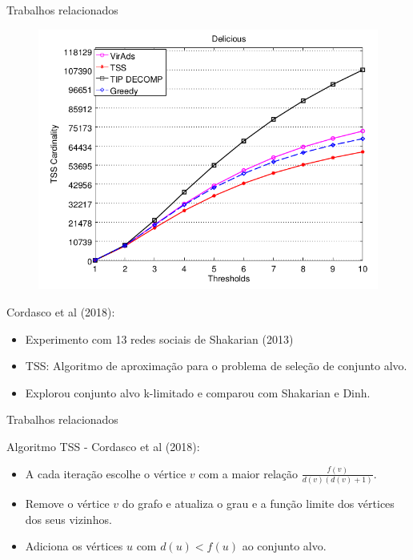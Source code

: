 \documentclass{beamer}
\begin{document}
\begin{frame}{Trabalhos relacionados}
\protect\hypertarget{trabalhos-relacionados-3}{}
\begin{figure}
\centering
\includegraphics[scale=0.2]{img/cordasco.png}
\end{figure}

Cordasco et al (2018):

\begin{itemize}
\tightlist
\item
  Experimento com 13 redes sociais de Shakarian (2013)
\item
  TSS: Algoritmo de aproximação para o problema de seleção de conjunto
  alvo.
\item
  Explorou conjunto alvo k-limitado e comparou com Shakarian e Dinh.
\end{itemize}
\end{frame}

\begin{frame}{Trabalhos relacionados}

Algoritmo TSS - Cordasco et al (2018):

\begin{itemize}
\tightlist
\item
  A cada iteração escolhe o vértice \(v\) com a maior relação
  \(\frac{f(v)}{d(v)(d(v)+1)}\).
\item
  Remove o vértice \(v\) do grafo e atualiza o grau e a função limite
  dos vértices dos seus vizinhos.
\item
  Adiciona os vértices \(u\) com \(d(u)<f(u)\) ao conjunto alvo.
\end{itemize}
\end{frame}
\end{document}
